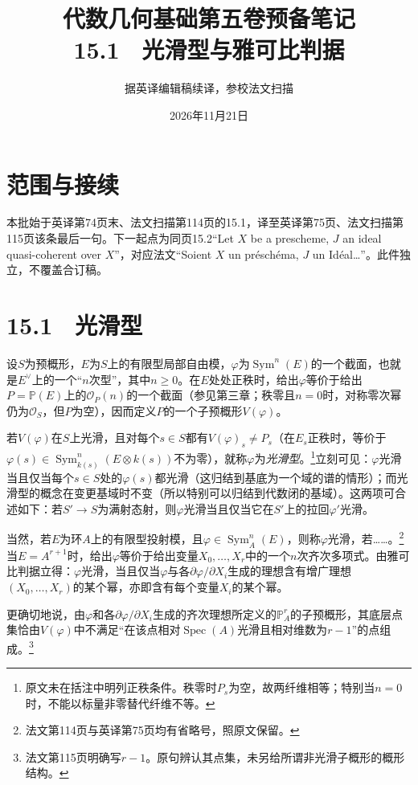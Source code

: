 \documentclass[openany,fontset=fandol]{ctexbook}
\newcommand{\OO}{\mathcal O}
\DeclareMathOperator{\Sym}{Sym}
\DeclareMathOperator{\Spec}{Spec}
\begin{document}
\title{代数几何基础第五卷预备笔记\\15.1　光滑型与雅可比判据}
\author{据英译编辑稿续译，参校法文扫描}
\date{2026年11月21日}
\maketitle
\chapter*{范围与接续}
本批始于英译第74页末、法文扫描第114页的15.1，译至英译第75页、法文扫描第115页该条最后一句。下一起点为同页15.2“Let $X$ be a prescheme, $J$ an ideal quasi-coherent over $X$”，对应法文“Soient $X$ un préschéma, $J$ un Idéal…”。此件独立，不覆盖合订稿。
\chapter*{15.1　光滑型}
设$S$为预概形，$E$为$S$上的有限型局部自由模，$\varphi$为$\Sym^n(E)$的一个截面，也就是$E^\vee$上的一个“$n$次型”，其中$n\ge0$。在$E$处处正秩时，给出$\varphi$等价于给出$P=\mathbb P(E)$上的$\OO_P(n)$的一个截面（参见第三章；秩零且$n=0$时，对称零次幂仍为$\OO_S$，但$P$为空），因而定义$P$的一个子预概形$V(\varphi)$。

若$V(\varphi)$在$S$上光滑，且对每个$s\in S$都有$V(\varphi)_s\ne P_s$（在$E_s$正秩时，等价于$\varphi(s)\in\Sym_{k(s)}^n(E\otimes k(s))$不为零），就称$\varphi$为\emph{光滑型}。\footnote{原文未在括注中明列正秩条件。秩零时$P_s$为空，故两纤维相等；特别当$n=0$时，不能以标量非零替代纤维不等。}立刻可见：$\varphi$光滑当且仅当每个$s\in S$处的$\varphi(s)$都光滑（这归结到基底为一个域的谱的情形）；而光滑型的概念在变更基域时不变（所以特别可以归结到代数闭的基域）。这两项可合述如下：若$S'\to S$为满射态射，则$\varphi$光滑当且仅当它在$S'$上的拉回$\varphi'$光滑。

当然，若$E$为环$A$上的有限型投射模，且$\varphi\in\Sym_A^n(E)$，则称$\varphi$光滑，若……。\footnote{法文第114页与英译第75页均有省略号，照原文保留。}当$E=A^{r+1}$时，给出$\varphi$等价于给出变量$X_0,\ldots,X_r$中的一个$n$次齐次多项式。由雅可比判据立得：$\varphi$光滑，当且仅当$\varphi$与各$\partial\varphi/\partial X_i$生成的理想含有增广理想$(X_0,\ldots,X_r)$的某个幂，亦即含有每个变量$X_i$的某个幂。

更确切地说，由$\varphi$和各$\partial\varphi/\partial X_i$生成的齐次理想所定义的$\mathbb P_A^r$的子预概形，其底层点集恰由$V(\varphi)$中不满足“在该点相对$\Spec(A)$光滑且相对维数为$r-1$”的点组成。\footnote{法文第115页明确写$r-1$。原句辨认其点集，未另给所谓非光滑子概形的概形结构。}
\end{document}
